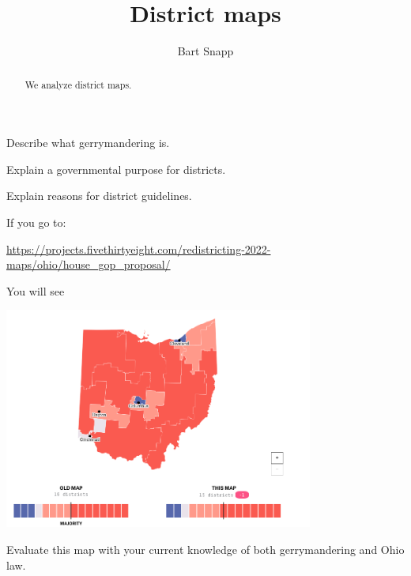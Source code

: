 \documentclass[noauthor,nooutcomes,hints,handout]{ximera}
\title{District maps}
\author{Bart Snapp}
\begin{document}
\begin{abstract}
  We analyze district maps.
\end{abstract}
\maketitle

\begin{listOutcomes}
\item Describe what gerrymandering is.
\item Explain a governmental purpose for districts.
\item Explain reasons for district guidelines.
\end{listOutcomes}




\mynewpage






\begin{question}
    If you go to:
  \begin{center}
  \url{https://projects.fivethirtyeight.com/redistricting-2022-maps/ohio/house_gop_proposal/}
  \end{center}
  You will see
  \begin{center}
    \includegraphics[width=4in]{houseGOP.png}
  \end{center}
  Evaluate this map with your current knowledge of both gerrymandering and Ohio law.
\end{question}


\mynewpage
\end{document}
